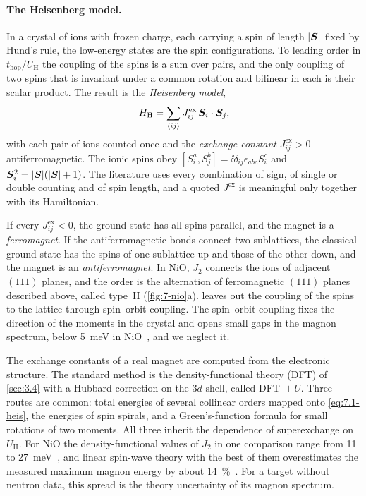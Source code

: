 \paragraph{The Heisenberg model.} In a crystal of ions with frozen charge, each carrying a spin of length $|\bm{S}|$ fixed by Hund's rule, the low-energy states are the spin configurations. To leading order in $t_{\mathrm{hop}}/U_{\mathrm{H}}$ the coupling of the spins is a sum over pairs, and the only coupling of two spins that is invariant under a common rotation and bilinear in each is their scalar product. The result is the \emph{Heisenberg model},
\begin{equation}
  H_{\mathrm{H}} = \sum_{\langle ij\rangle}J^{\mathrm{ex}}_{ij}\,\bm{S}_i\cdot\bm{S}_j ,
  \label{eq:7.1-heis}
\end{equation}
with each pair of ions counted once and the \emph{exchange constant} $J^{\mathrm{ex}}_{ij} > 0$ antiferromagnetic. The ionic spins obey $[S^a_i, S^b_j] = \ii\delta_{ij}\epsilon_{abc}S^c_i$ and $\bm{S}_i^2 = |\bm{S}|(|\bm{S}| + 1)$. The literature uses every combination of sign, of single or double counting and of spin length, and a quoted $J^{\mathrm{ex}}$ is meaningful only together with its Hamiltonian.

If every $J^{\mathrm{ex}}_{ij} < 0$, the ground state has all spins parallel, and the magnet is a \emph{ferromagnet}. If the antiferromagnetic bonds connect two sublattices, the classical ground state has the spins of one sublattice up and those of the other down, and the magnet is an \emph{antiferromagnet}. In NiO, $J_2$ connects the ions of adjacent $(111)$ planes, and the order is the alternation of ferromagnetic $(111)$ planes described above, called type~II (\cref{fig:7-nio}a).  leaves out the coupling of the spins to the lattice through spin--orbit coupling. The spin--orbit coupling fixes the direction of the moments in the crystal and opens small gaps in the magnon spectrum, below \SI{5}{meV} in NiO~\cite[Sect.~III]{dossantos2026comparative}, and we neglect it.

The exchange constants of a real magnet are computed from the electronic structure. The standard method is the density-functional theory (DFT) of \cref{sec:3.4} with a Hubbard correction on the $3d$ shell, called DFT~$+\,U$. Three routes are common: total energies of several collinear orders mapped onto \cref{eq:7.1-heis}, the energies of spin spirals, and a Green's-function formula for small rotations of two moments. All three inherit the dependence of superexchange on $U_{\mathrm{H}}$. For NiO the density-functional values of $J_2$ in one comparison range from 11 to \SI{27}{meV}~\cite[Table~III]{fischer2009exchange}, and linear spin-wave theory with the best of them overestimates the measured maximum magnon energy by about \SI{14}{\percent}~\cite[Sect.~III]{dossantos2026comparative}. For a target without neutron data, this spread is the theory uncertainty of its magnon spectrum.

